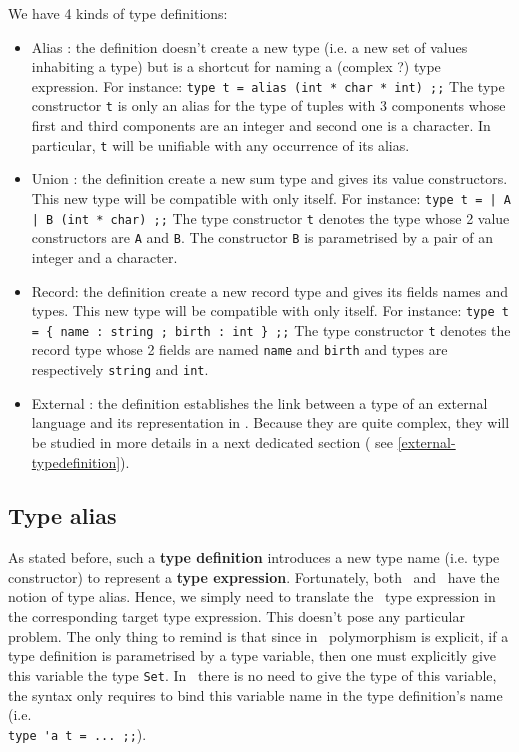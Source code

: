We have 4 kinds of type definitions:
\begin{itemize}
  \item Alias : the definition doesn't create a new type (i.e. a new
    set of values inhabiting a type) but is a shortcut for naming a
    (complex ?) type expression. For instance:
    {\footnotesize\lstinline!type t = alias (int * char * int) ;;!}
    The type constructor {\tt t} is only an alias for the type of
    tuples with 3 components whose first and third components are an
    integer and second one is a character. In particular, {\tt t} will
    be unifiable with any occurrence of its alias. 
  \item Union : the definition create a new sum type and gives its
    value constructors. This new type will be compatible with only
    itself. For instance:
    {\footnotesize\lstinline!type t = | A | B (int * char) ;;!}
    The type constructor {\tt t} denotes the type whose 2 value
    constructors are {\tt A} and {\tt B}. The constructor {\tt B} is
    parametrised by a pair of an integer and a character.
  \item Record: the definition create a new record type and gives its
    fields names and types. This new type will be compatible with only
    itself. For instance:
    {\footnotesize\lstinline!type t = { name : string ; birth : int } ;;!}
    The type constructor {\tt t} denotes the record type whose 2
    fields are named {\tt name} and {\tt birth} and types are
    respectively {\tt string} and {\tt int}.
  \item External : the definition establishes the link between a type
    of an external language and its representation in
    \focalize. Because they are quite complex, they will be studied in
    more details in a next dedicated section (
    see \ref{external-typedefinition}).
\end{itemize}


\subsection{Type alias}
As stated before, such a {\bf type definition} introduces a new type
name (i.e. type constructor) to represent a
{\bf type expression}. Fortunately, both \ocaml\ and \coq\ have the
notion of type alias. Hence, we simply need to translate the
\focalize\ type expression in the corresponding target type
expression. This doesn't pose any particular problem. The only thing
to remind is that since in \coq\ polymorphism is explicit, if a type
definition is parametrised by a type variable, then one must
explicitly give this variable the type {\tt Set}. In \ocaml\, there
is no need to give the type of this variable, the syntax only requires
to bind this variable name in the type definition's name (i.e. \\
\lstinline!type 'a t = ... ;;!).


